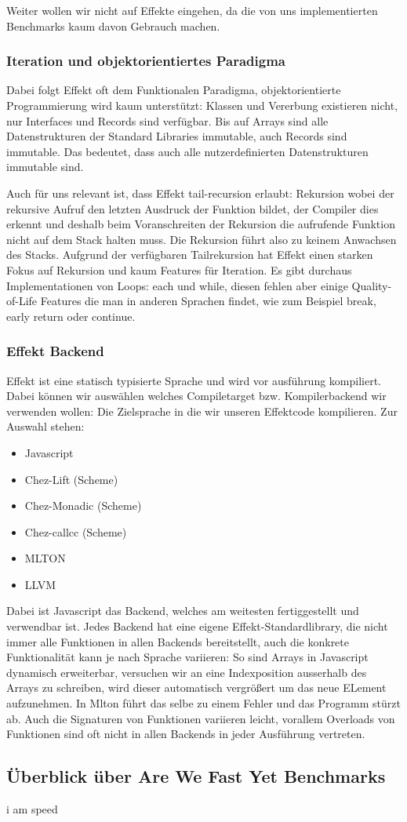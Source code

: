 Weiter wollen wir nicht auf Effekte eingehen, da die von uns implementierten Benchmarks kaum davon Gebrauch machen.

\subsubsection{ Iteration und objektorientiertes Paradigma }

Dabei folgt Effekt oft dem Funktionalen Paradigma, objektorientierte Programmierung wird kaum unterstützt:
Klassen und Vererbung existieren nicht, nur Interfaces und Records sind verfügbar.
Bis auf Arrays sind alle Datenstrukturen der Standard Libraries immutable, auch Records sind immutable. Das bedeutet, dass auch alle nutzerdefinierten Datenstrukturen immutable sind.

Auch für uns relevant ist, dass Effekt tail-recursion erlaubt: Rekursion wobei der rekursive Aufruf den letzten Ausdruck der Funktion bildet, der Compiler dies erkennt und deshalb beim Voranschreiten der Rekursion die aufrufende Funktion nicht auf dem Stack halten muss. Die Rekursion führt also zu keinem Anwachsen des Stacks. 
Aufgrund der verfügbaren Tailrekursion hat Effekt einen starken Fokus auf Rekursion und kaum Features für Iteration. Es gibt durchaus Implementationen von Loops: each und while, diesen fehlen aber einige Quality-of-Life Features die man in anderen Sprachen findet, wie zum Beispiel break, early return oder continue.

\subsubsection{ Effekt Backend }
Effekt ist eine statisch typisierte Sprache und wird vor ausführung kompiliert.
Dabei können wir auswählen welches Compiletarget bzw. Kompilerbackend wir verwenden wollen: Die Zielsprache in die wir unseren Effektcode kompilieren.
Zur Auswahl stehen:
\begin{itemize}
    \item Javascript
    \item Chez-Lift (Scheme)
    \item Chez-Monadic (Scheme)
    \item Chez-callcc (Scheme)
    \item MLTON
    \item LLVM
\end{itemize}
Dabei ist Javascript das Backend, welches am weitesten fertiggestellt und verwendbar ist. Jedes Backend hat eine eigene Effekt-Standardlibrary, die nicht immer alle Funktionen in allen Backends bereitstellt, auch die konkrete Funktionalität kann je nach Sprache variieren:
So sind Arrays in Javascript dynamisch erweiterbar, versuchen wir an eine Indexposition ausserhalb des Arrays zu schreiben, wird dieser automatisch vergrößert um das neue ELement aufzunehmen.
In Mlton führt das selbe zu einem Fehler und das Programm stürzt ab.
Auch die Signaturen von Funktionen variieren leicht, vorallem Overloads von Funktionen sind oft nicht in allen Backends in jeder Ausführung vertreten.

\subsection{ Überblick über Are We Fast Yet Benchmarks }
i am speed